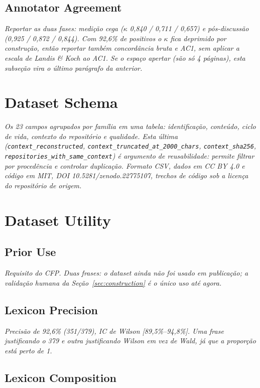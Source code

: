 \documentclass[10pt,conference]{IEEEtran}
\begin{document}
\subsection{Annotator Agreement}

\textit{Reportar as duas fases: medição cega (\(\kappa\) 0,840 / 0,711 / 0,657)
e pós-discussão (0,925 / 0,872 / 0,844). Com 92,6\% de positivos o \(\kappa\)
fica deprimido por construção, então reportar também concordância bruta e AC1,
sem aplicar a escala de Landis \& Koch ao AC1. Se o espaço apertar (são só 4
páginas), esta subseção vira o último parágrafo da anterior.}

\section{Dataset Schema}
\label{sec:schema}

\textit{Os 23 campos agrupados por família em uma tabela: identificação,
conteúdo, ciclo de vida, contexto do repositório e qualidade. Esta última
(\texttt{context\_reconstructed}, \texttt{context\_truncated\_at\_2000\_chars},
\texttt{context\_sha256}, \texttt{repositories\_with\_same\_context}) é
argumento de reusabilidade: permite filtrar por procedência e controlar
duplicação. Formato CSV, dados em CC BY 4.0 e código em MIT, DOI
10.5281/zenodo.22775107, trechos de código sob a licença do repositório de
origem.}

\section{Dataset Utility}
\label{sec:utility}

\subsection{Prior Use}

\textit{Requisito do CFP. Duas frases: o dataset ainda não foi usado em
publicação; a validação humana da Seção~\ref{sec:construction} é o único uso
até agora.}

\subsection{Lexicon Precision}

\textit{Precisão de 92,6\% (351/379), IC de Wilson [89,5\%--94,8\%]. Uma frase
justificando o 379 e outra justificando Wilson em vez de Wald, já que a
proporção está perto de 1.}

\subsection{Lexicon Composition}
\end{document}
